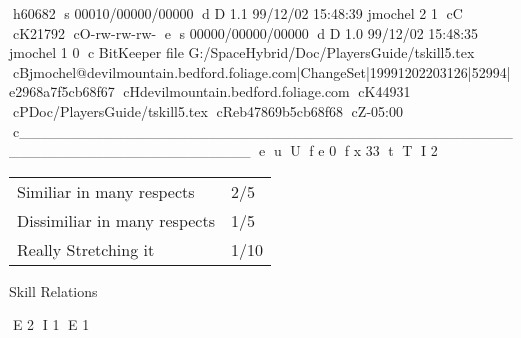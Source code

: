 h60682
s 00010/00000/00000
d D 1.1 99/12/02 15:48:39 jmochel 2 1
cC
cK21792
cO-rw-rw-rw-
e
s 00000/00000/00000
d D 1.0 99/12/02 15:48:35 jmochel 1 0
c BitKeeper file G:/SpaceHybrid/Doc/PlayersGuide/tskill5.tex
cBjmochel@devilmountain.bedford.foliage.com|ChangeSet|19991202203126|52994|e2968a7f5cb68f67
cHdevilmountain.bedford.foliage.com
cK44931
cPDoc/PlayersGuide/tskill5.tex
cReb47869b5cb68f68
cZ-05:00
c______________________________________________________________________
e
u
U
f e 0
f x 33
t
T
I 2
\begin{SHTable}[h]
	\begin{tabular}{l|l}
	Similiar in many respects     &       2/5 \\
	Dissimiliar in many respects  &       1/5 \\
	Really Stretching it		  &       1/10 \\ 
    \end{tabular}
    \caption{Skill Relations}
\end{SHTable}
E 2
I 1
E 1
